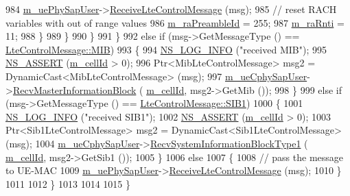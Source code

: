 \begin{DoxyCode}
984                       \hyperlink{classns3_1_1LteUePhy_a18ef57afea937e2e4bcc5b87bfd6ae68}{m\_uePhySapUser}->\hyperlink{classns3_1_1LteUePhySapUser_abf93eec5c0ad47e505381e26b5dc0a85}{ReceiveLteControlMessage} (msg);
985                       \textcolor{comment}{// reset RACH variables with out of range values}
986                       \hyperlink{classns3_1_1LteUePhy_af3baaa1596e4ac3218a84129e65c1d78}{m\_raPreambleId} = 255;
987                       \hyperlink{classns3_1_1LteUePhy_affe6f8e8fcf03482b57c92c74637cc4e}{m\_raRnti} = 11;
988                     \}
989                 \}
990             \}
991         \}
992       \textcolor{keywordflow}{else} \textcolor{keywordflow}{if} (msg->GetMessageType () == \hyperlink{classns3_1_1LteControlMessage_a9f9798d5aa8ad40f6432285b4b06135ba4dabc967ab045bb1e5e9c2060b0d9a8d}{LteControlMessage::MIB})
993         \{
994           \hyperlink{group__logging_gafbd73ee2cf9f26b319f49086d8e860fb}{NS\_LOG\_INFO} (\textcolor{stringliteral}{"received MIB"});
995           \hyperlink{assert_8h_a6dccdb0de9b252f60088ce281c49d052}{NS\_ASSERT} (\hyperlink{classns3_1_1LtePhy_ac53d10d27f1bde64807a3ff366662787}{m\_cellId} > 0);
996           Ptr<MibLteControlMessage> msg2 = DynamicCast<MibLteControlMessage> (msg);
997           \hyperlink{classns3_1_1LteUePhy_aafa9d260efb47f9b0822814dc421a438}{m\_ueCphySapUser}->\hyperlink{classns3_1_1LteUeCphySapUser_a6b48cc819f095ed29a7580f94f6765ec}{RecvMasterInformationBlock} (
      \hyperlink{classns3_1_1LtePhy_ac53d10d27f1bde64807a3ff366662787}{m\_cellId}, msg2->GetMib ());
998         \}
999       \textcolor{keywordflow}{else} \textcolor{keywordflow}{if} (msg->GetMessageType () == \hyperlink{classns3_1_1LteControlMessage_a9f9798d5aa8ad40f6432285b4b06135ba09434c7ac463bc1bf439d10e5c1cb164}{LteControlMessage::SIB1})
1000         \{
1001           \hyperlink{group__logging_gafbd73ee2cf9f26b319f49086d8e860fb}{NS\_LOG\_INFO} (\textcolor{stringliteral}{"received SIB1"});
1002           \hyperlink{assert_8h_a6dccdb0de9b252f60088ce281c49d052}{NS\_ASSERT} (\hyperlink{classns3_1_1LtePhy_ac53d10d27f1bde64807a3ff366662787}{m\_cellId} > 0);
1003           Ptr<Sib1LteControlMessage> msg2 = DynamicCast<Sib1LteControlMessage> (msg);
1004           \hyperlink{classns3_1_1LteUePhy_aafa9d260efb47f9b0822814dc421a438}{m\_ueCphySapUser}->\hyperlink{classns3_1_1LteUeCphySapUser_aac4ef620b88531ba04617e024392a73e}{RecvSystemInformationBlockType1} (
      \hyperlink{classns3_1_1LtePhy_ac53d10d27f1bde64807a3ff366662787}{m\_cellId}, msg2->GetSib1 ());
1005         \}
1006       \textcolor{keywordflow}{else}
1007         \{
1008           \textcolor{comment}{// pass the message to UE-MAC}
1009           \hyperlink{classns3_1_1LteUePhy_a18ef57afea937e2e4bcc5b87bfd6ae68}{m\_uePhySapUser}->\hyperlink{classns3_1_1LteUePhySapUser_abf93eec5c0ad47e505381e26b5dc0a85}{ReceiveLteControlMessage} (msg);
1010         \}
1011 
1012     \}
1013 
1014 
1015 \}
\end{DoxyCode}


